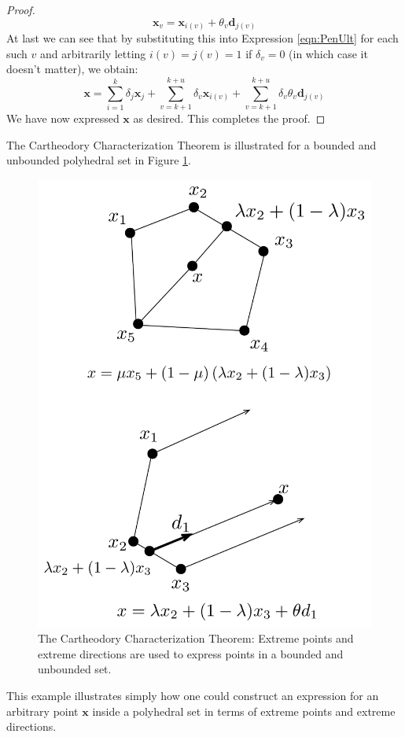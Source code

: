 \begin{proof}
\begin{displaymath}
\mathbf{x}_v = \mathbf{x}_{i(v)} + \theta_v\mathbf{d}_{j(v)}
\end{displaymath}
At last we can see that by substituting this into Expression \ref{eqn:PenUlt} for each such $v$ and arbitrarily letting $i(v) = j(v) = 1$ if $\delta_v = 0$ (in which case it doesn't matter), we obtain:
\begin{equation}
\mathbf{x} = \sum_{i=1}^k\delta_j\mathbf{x}_j + \sum_{v=k+1}^{k+u}\delta_v\mathbf{x}_{i(v)} + \sum_{v=k+1}^{k+u}\delta_v\theta_v\mathbf{d}_{j(v)}
\end{equation}
We have now expressed $\mathbf{x}$ as desired. This completes the proof.
\end{proof}

\begin{example} The Cartheodory Characterization Theorem is illustrated for a bounded and unbounded polyhedral set in Figure \ref{fig:Carth}.
\begin{figure}[htbp]
\centering
\includegraphics[scale=0.35]{Cartheodoary.pdf}
\caption{The Cartheodory Characterization Theorem: Extreme points and extreme directions are used to express points in a bounded and unbounded set.}
\label{fig:Carth}
\end{figure}
This example illustrates simply how one could construct an expression for an arbitrary point $\mathbf{x}$ inside a polyhedral set in terms of extreme points and extreme directions.
\end{example}
